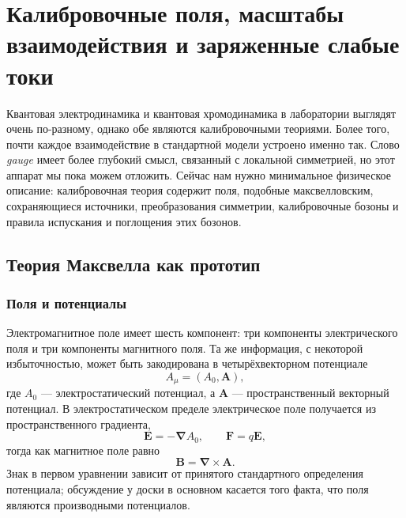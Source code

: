 \chapter{Калибровочные поля, масштабы взаимодействия и заряженные слабые токи}

Квантовая электродинамика и квантовая хромодинамика в лаборатории выглядят очень по-разному, однако обе являются калибровочными теориями. Более того, почти каждое взаимодействие в стандартной модели устроено именно так. Слово \emph{gauge} имеет более глубокий смысл, связанный с локальной симметрией, но этот аппарат мы пока можем отложить. Сейчас нам нужно минимальное физическое описание: калибровочная теория содержит поля, подобные максвелловским, сохраняющиеся источники, преобразования симметрии, калибровочные бозоны и правила испускания и поглощения этих бозонов.

\section{Теория Максвелла как прототип}

\subsection{Поля и потенциалы}

Электромагнитное поле имеет шесть компонент: три компоненты электрического поля и три компоненты магнитного поля. Та же информация, с некоторой избыточностью, может быть закодирована в четырёхвекторном потенциале
\begin{equation}
A_\mu=(A_0,\boldsymbol A),
\end{equation}
где \(A_0\) — электростатический потенциал, а \(\boldsymbol A\) — пространственный векторный потенциал. В электростатическом пределе электрическое поле получается из пространственного градиента,
\begin{equation}
\boldsymbol E=-\boldsymbol\nabla A_0,
\qquad
\boldsymbol F=q\boldsymbol E,
\end{equation}
тогда как магнитное поле равно
\begin{equation}
\boldsymbol B=\boldsymbol\nabla\times\boldsymbol A.
\end{equation}
Знак в первом уравнении зависит от принятого стандартного определения потенциала; обсуждение у доски в основном касается того факта, что поля являются производными потенциалов.

